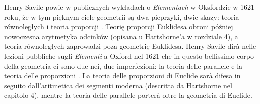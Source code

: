 Henry Savile powie w publicznych wykładach o \emph{Elementach} w Oksfordzie w 1621 roku, że w tym pięknym ciele geometrii są dwa pieprzyki, dwie skazy: teoria równoległych i teoria proporcji \cite[s. 304]{hartshorne_2000}. %
Teorię proporcji Euklidesa obroni później nowoczesna arytmetyka odcinków (opisana u Hartshorne'a w rozdziale 4), a teoria równoległych zaprowadzi poza geometrię Euklidesa. %
Henry Savile dirà nelle lezioni pubbliche sugli \emph{Elementi} a Oxford nel 1621 che in questo bellissimo corpo della geometria ci sono due nei, due imperfezioni: la teoria delle parallele e la teoria delle proporzioni \cite[p. 304]{hartshorne_2000}. %
La teoria delle proporzioni di Euclide sarà difesa in seguito dall'aritmetica dei segmenti moderna (descritta da Hartshorne nel capitolo 4), mentre la teoria delle parallele porterà oltre la geometria di Euclide. %
%
